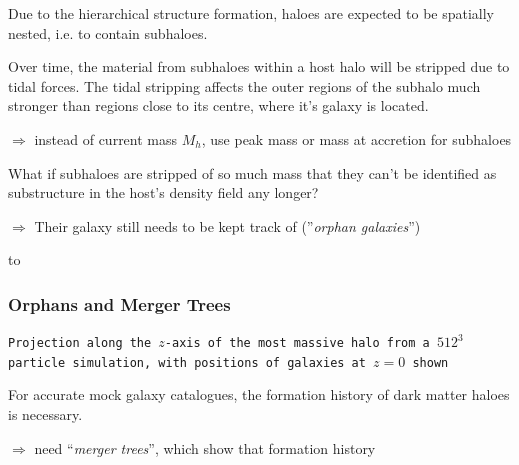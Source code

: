 \begin{frame}
    
    Due to the hierarchical structure formation, haloes are expected to be spatially nested, i.e. to contain subhaloes.
    
    Over time, the material from subhaloes within a host halo will be stripped due to tidal forces. The tidal stripping affects the outer regions of the subhalo much stronger than regions close to its centre, where it's galaxy is located.
    
    $\Rightarrow$ instead of current mass $M_h$, use peak mass or mass at accretion for subhaloes 
    
    What if subhaloes are stripped of so much mass that they can't be identified as substructure in the host's density field any longer?
    
    $\Rightarrow$ Their galaxy still needs to be kept track of (''\emph{orphan galaxies}'')
    
\end{frame}



{
    {\vbox to }
    \begin{frame}
        \frametitle{Orphans and Merger Trees}
        \vspace{4.5cm}

        {
            \small
            \texttt{Projection along the $z$-axis of the most massive halo from a $512^3$ particle simulation, with positions of galaxies at $z=0$ shown
                } \\[.5em]
        }
        
        For accurate mock galaxy catalogues, the formation history of dark matter haloes is necessary.
        
        $\Rightarrow$ need ``\emph{merger trees}'', which show that formation history
    \end{frame}
}

